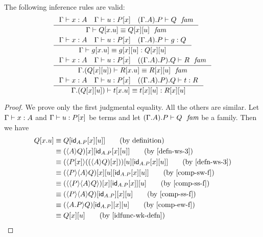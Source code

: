 \begin{lem}
The following inference rules are valid:
\begin{align*}
& \inference{\jterm{\Gamma}{A}{x}\quad\jterm{\Gamma}{\subst{x}{P}}{u}\quad\jfam{{{\Gamma}{A}}{P}}{Q}}
  {\jfameq{\Gamma}{\subst{\ctxext{x}{u}}{Q}}{\subst{u}{{x}{Q}}}}\\
& \inference{\jterm{\Gamma}{A}{x}\quad\jterm{\Gamma}{\subst{x}{P}}{u}\quad\jterm{{{\Gamma}{A}}{P}}{Q}{g}}
  {\jtermeq{\Gamma}{\subst{u}{{x}{Q}}}{\subst{\ctxext{x}{u}}{g}}{\subst{u}{{x}{g}}}}\\
& \inference{\jterm{\Gamma}{A}{x}\quad\jterm{\Gamma}{\subst{x}{P}}{u}\quad\jfam{{{{\Gamma}{A}}{P}}{Q}}{R}}
  {\jfameq{{\Gamma}{\subst{u}{{x}{Q}}}}{\subst{\ctxext{x}{u}}{R}}{\subst{u}{{x}{R}}}}\\
& \inference{\jterm{\Gamma}{A}{x}\quad\jterm{\Gamma}{\subst{x}{P}}{u}\quad\jterm{{{{\Gamma}{A}}{P}}{Q}}{R}{t}}
  {\jtermeq{{\Gamma}{\subst{u}{{x}{Q}}}}{\subst{u}{{x}{R}}}{\subst{\ctxext{x}{u}}{t}}{\subst{u}{{x}{t}}}}
\end{align*}
\end{lem}

\begin{proof}
We prove only the first judgmental equality. All the others are similar.
Let $\jterm{\Gamma}{A}{x}$ and $\jterm{\Gamma}{\subst{x}{P}}{u}$
be terms and let $\jfam{{{\Gamma}{A}}{P}}{Q}$ be a family. Then we have
\begin{align*}
\subst{\ctxext{x}{u}}{Q} 
& \jdeq \subst{{u}{{x}{\idfunc[\ctxext{A}{P}]}}}{Q} \tag{by definition}\\
& \jdeq \subst{{u}{{x}{\idfunc[\ctxext{A}{P}]}}}{{x}{\ctxwk{A}{Q}}}\tag{by \autoref{defn-ws-3}}\\
& \jdeq \subst{{u}{{x}{\idfunc[\ctxext{A}{P}]}}}{{u}{\ctxwk{\subst{x}{P}}{\subst{x}{\ctxwk{A}{Q}}}}}\tag{by \autoref{defn-ws-3}}\\
& \jdeq \subst{{u}{{x}{\idfunc[\ctxext{A}{P}]}}}{{u}{{x}{\ctxwk{P}{{A}{Q}}}}}\tag{by \autoref{comp-sw-f}}\\
& \jdeq \subst{u}{{{x}{\idfunc[\ctxext{A}{P}]}}{{x}{\ctxwk{{P}{{A}{Q}}}}}}\tag{by \autoref{comp-ss-f}}\\
& \jdeq \subst{u}{{x}{{\idfunc[\ctxext{A}{P}]}{\ctxwk{P}{{A}{Q}}}}}\tag{by \autoref{comp-ss-f}}\\
& \jdeq \subst{u}{{x}{{\idfunc[\ctxext{A}{P}]}{\ctxwk{\ctxext{A}{P}}{Q}}}}\tag{by \autoref{comp-ew-f}}\\
& \jdeq \subst{u}{{x}{Q}}\tag{by \autoref{idfunc-wk-defn}}
\end{align*}
\end{proof}

